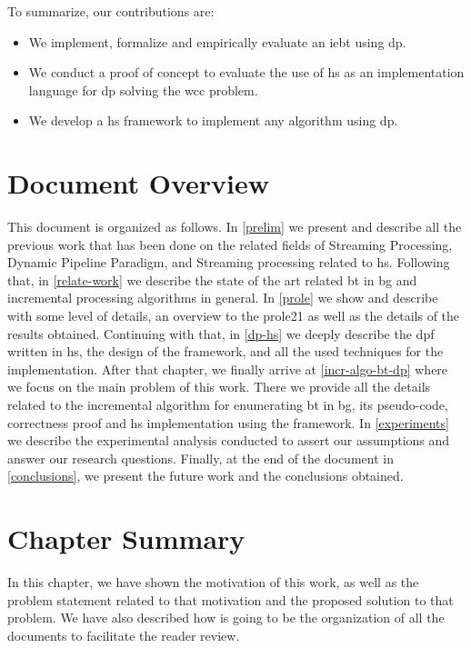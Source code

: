 To summarize, our contributions are:
\begin{itemize}
  \item We implement, formalize and empirically evaluate an \acrlong{iebt} using \acrlong{dp}.
  \item We conduct a proof of concept to evaluate the use of \acrlong{hs} as an implementation language for \acrlong{dp} solving the \acrlong{wcc} problem.
  \item We develop a \acrshort{hs} framework to implement any algorithm using \acrlong{dp}.
\end{itemize}

\section{Document Overview}
This document is organized as follows. In \autoref{prelim} we present and describe all the previous work that has been done on the related fields of Streaming Processing, Dynamic Pipeline Paradigm, and Streaming processing related to \acrshort{hs}. 
Following that, in \autoref{relate-work} we describe the state of the art related \acrshort{bt} in \acrshort{bg} and incremental processing algorithms in general.
In \autoref{prole} we show and describe with some level of details, an overview to the \acrshort{prole21} as well as the details of the results obtained. 
Continuing with that, in \autoref{dp-hs} we deeply describe the \acrshort{dpf} written in \acrshort{hs}, the design of the framework, and all the used techniques for the implementation.
After that chapter, we finally arrive at \autoref{incr-algo-bt-dp} where we focus on the main problem of this work. There we provide all the details related to the incremental algorithm for enumerating \acrshort{bt} in \acrshort{bg}, its pseudo-code,
correctness proof and \acrshort{hs} implementation using the framework.
In \autoref{experiments} we describe the experimental analysis conducted to assert our assumptions and answer our research questions.
Finally, at the end of the document in \autoref{conclusions}, we present the future work and the conclusions obtained.

\section{Chapter Summary}
In this chapter, we have shown the motivation of this work, as well as the problem statement related to that motivation and the proposed solution to that problem.
We have also described how is going to be the organization of all the documents to facilitate the reader review.
